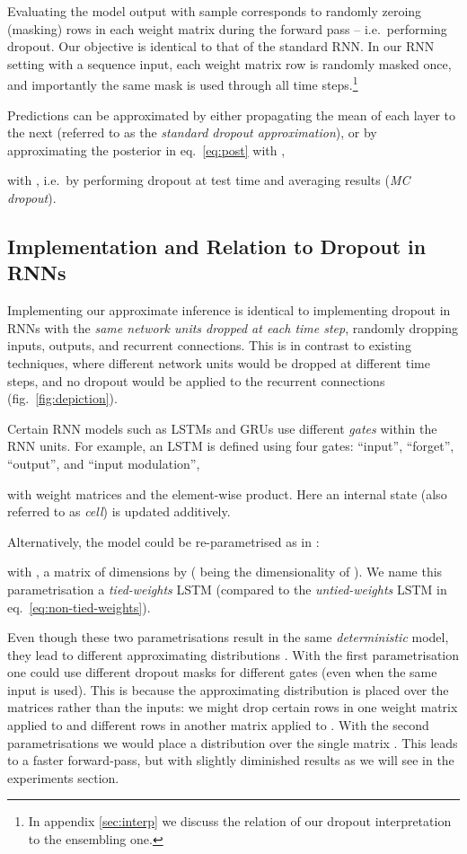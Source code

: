 \documentclass{article}
\theoremstyle{definition}
\begin{document}
Evaluating the model output  with sample  corresponds to randomly zeroing (masking) rows in each weight matrix  during the forward pass -- i.e.\ performing dropout. 
Our objective  is identical to that of the standard RNN.
In our RNN setting with a sequence input, each weight matrix row is randomly masked once, and importantly the same mask is used through all time steps.\footnote{In appendix \ref{sec:interp} we discuss the relation of our dropout interpretation to the ensembling one.}

Predictions can be approximated by either propagating the mean of each layer to the next (referred to as the \textit{standard dropout approximation}), or by approximating the posterior in eq.\ \eqref{eq:post} with ,

with , i.e.\ by performing dropout at test time and averaging results (\textit{MC dropout}).



\subsection{Implementation and Relation to Dropout in RNNs}
\label{sec:impl-details}


Implementing our approximate inference is identical to implementing dropout in RNNs with the \textit{same network units dropped at each time step}, randomly dropping inputs, outputs, and recurrent connections. This is in contrast to existing techniques, where different network units would be dropped at different time steps, and no dropout would be applied to the recurrent connections (fig.\ \ref{fig:depiction}). 

Certain RNN models such as LSTMs and GRUs use different \textit{gates} within the RNN units. 
For example, an LSTM is defined using four gates: ``input'', ``forget'', ``output'', and ``input modulation'',
\renewcommand{\i}{\mathbf{i}}
\newcommand{\g}{\mathbf{g}}
\renewcommand{\o}{\mathbf{o}}

with  weight matrices and  the element-wise product. 
Here an internal state  (also referred to as \textit{cell}) is updated additively. 

Alternatively, the model could be re-parametrised as in \citep{graves2013speech}:

with ,  a matrix of dimensions  by  ( being the dimensionality of ). We name this parametrisation a \textit{tied-weights} LSTM (compared to the \textit{untied-weights} LSTM in eq.\ \eqref{eq:non-tied-weights}).

Even though these two parametrisations result in the same \textit{deterministic} model, they lead to different approximating distributions .
With the first parametrisation one could use different dropout masks for different gates (even when the same input  is used). This is because the approximating distribution is placed over the matrices rather than the inputs: we might drop certain rows in one weight matrix  applied to  and different rows in another matrix  applied to . 
With the second parametrisations we would place a distribution over the single matrix .
This leads to a faster forward-pass, but with slightly diminished results as we will see in the experiments section.
\end{document}
